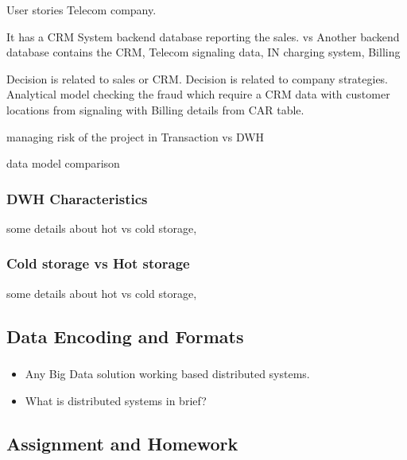 User stories Telecom company.

It has a CRM System backend database reporting the sales. vs Another backend database contains the CRM, Telecom signaling data, IN charging system, Billing

Decision is related to sales or CRM. Decision is related to company strategies.
Analytical model checking the fraud which require a CRM data with customer locations from signaling with Billing details from CAR table.


managing risk of the project in Transaction vs DWH




data model comparison



\begin{frame}
\frametitle{DWH Characteristics}

some details about hot vs cold storage,

\end{frame}



\begin{frame}

\frametitle{Cold storage vs Hot storage}

some details about hot vs cold storage,

\end{frame}



\subsection{Data Encoding and Formats}
\begin{frame}
\frametitle{\subsecname}
\begin{itemize}[<+->]
	\item Any Big Data solution working based distributed systems.
	\item What is distributed systems in brief?
\end{itemize}
\end{frame}


\subsection{Assignment and Homework}


